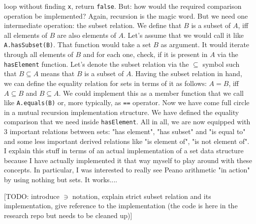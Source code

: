 loop without finding \verb|x|, return \verb|false|. But: how would the required comparison operation be implemented? Again, recursion is the magic word. But we need one intermediate operation: the subset relation. We define that $B$ is a subset of $A$, iff all elements of $B$ are also elements of $A$. Let's assume that we would call it like \verb|A.hasSubset(B)|. That function would take a set $B$ as argument. It would iterate through all elements of $B$ and for each one, check, if it is present in $A$ via the \verb|hasElement| function. Let's denote the subset relation via the $\subseteq$ symbol such that $B \subseteq A$ means that $B$ is a subset of $A$. Having the subset relation in hand, we can define the equality relation for sets in terms of it as follows: $A = B$, iff $A \subseteq B$ and $B \subseteq A$. We could implement this as a member function that we call like \verb|A.equals(B)| or, more typically, as \verb|==| operator. Now we have come full circle in a mutual recursion implementation structure. We have defined the equality comparison that we need inside \verb|hasElement|. All in all, we are now equipped with 3 important relations between sets: "has element", "has subset" and "is equal to" and some less important derived relations like "is element of", "is not element of". I explain this stuff in terms of an actual implementation of a set data structure because I have actually implemented it that way myself to play around with these concepts. In particular, I was interested to really see Peano arithmetic "in action" by using nothing but sets. It works....

[TODO: introduce $\ni$ notation, explain strict subset relation and its implementation, give reference to the implementation (the code is here in the research repo but needs to be cleaned up)]



